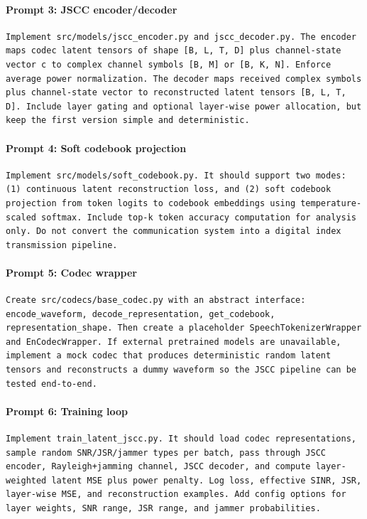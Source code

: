\documentclass[11pt,a4paper]{article}
\begin{document}
\paragraph{Prompt 3: JSCC encoder/decoder}
\begin{lstlisting}[style=promptstyle]
Implement src/models/jscc_encoder.py and jscc_decoder.py. The encoder maps codec latent tensors of shape [B, L, T, D] plus channel-state vector c to complex channel symbols [B, M] or [B, K, N]. Enforce average power normalization. The decoder maps received complex symbols plus channel-state vector to reconstructed latent tensors [B, L, T, D]. Include layer gating and optional layer-wise power allocation, but keep the first version simple and deterministic.
\end{lstlisting}

\paragraph{Prompt 4: Soft codebook projection}
\begin{lstlisting}[style=promptstyle]
Implement src/models/soft_codebook.py. It should support two modes: (1) continuous latent reconstruction loss, and (2) soft codebook projection from token logits to codebook embeddings using temperature-scaled softmax. Include top-k token accuracy computation for analysis only. Do not convert the communication system into a digital index transmission pipeline.
\end{lstlisting}

\paragraph{Prompt 5: Codec wrapper}
\begin{lstlisting}[style=promptstyle]
Create src/codecs/base_codec.py with an abstract interface: encode_waveform, decode_representation, get_codebook, representation_shape. Then create a placeholder SpeechTokenizerWrapper and EnCodecWrapper. If external pretrained models are unavailable, implement a mock codec that produces deterministic random latent tensors and reconstructs a dummy waveform so the JSCC pipeline can be tested end-to-end.
\end{lstlisting}

\paragraph{Prompt 6: Training loop}
\begin{lstlisting}[style=promptstyle]
Implement train_latent_jscc.py. It should load codec representations, sample random SNR/JSR/jammer types per batch, pass through JSCC encoder, Rayleigh+jamming channel, JSCC decoder, and compute layer-weighted latent MSE plus power penalty. Log loss, effective SINR, JSR, layer-wise MSE, and reconstruction examples. Add config options for layer weights, SNR range, JSR range, and jammer probabilities.
\end{lstlisting}
\end{document}

